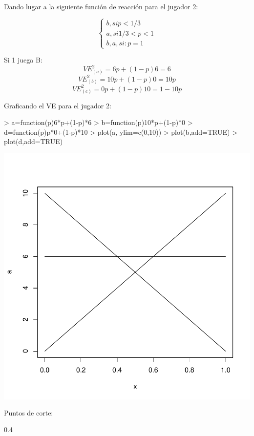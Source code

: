 \documentclass{article}
\begin{document}
Dando lugar a la siguiente funci\'on de reacci\'on para el jugador 2:

$$\left\{ \begin{array}{c} b, si p<1/3\\ a, si 1/3<p<1\\b,a, si: p=1\end{array}\right. $$


Si 1 juega B:
$$VE^2_{(a)}=6p+(1-p)6=6$$
$$VE^2_{(b)}=10p+(1-p)0=10p$$
$$VE^2_{(c)}=0p+(1-p)10=1-10p$$

Graficando el VE para el jugador 2:

\begin{Schunk}
\begin{Sinput}
> a=function(p){6*p+(1-p)*6}
> b=function(p){10*p+(1-p)*0}
> d=function(p){p*0+(1-p)*10}
> plot(a, ylim=c(0,10))
> plot(b,add=TRUE)
> plot(d,add=TRUE)
\end{Sinput}
\end{Schunk}
\includegraphics{PUTAPRUEBA-008}

Puntos de corte:
\begin{Schunk}
\begin{Soutput}
[1] 0.4
\end{Soutput}
\end{Schunk}
\end{document}
